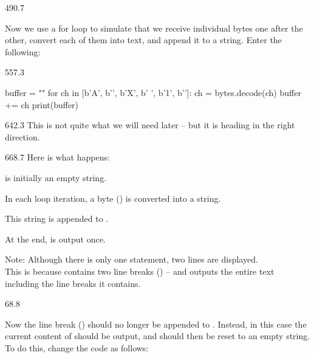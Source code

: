 \documentclass{aslab}
\newcommand*\codex[1]{\fontsize{10bp}{#1bp}\ttfamily\lineskiplimit=-\maxdimen}
\begin{document}
\begin{region}[pitch=13.2]{490.7}
\begin{tasks}[start=6]
\item Now we use a for loop to simulate that we receive individual bytes one
  after the other, convert each of them into text, and append it to a
  string.
  \blank
  Enter the following:
\end{tasks}
\end{region}

\begin{region}[x=74.7,right=0,pitch=14.3]{557.3}
\begin{codeblock}[basicstyle=\codex{14.3}]
buffer = ""
for ch in [b'A', b'\n', b'X', b' ', b'1', b'\n']:
    ch = bytes.decode(ch)
    buffer += ch
print(buffer)
\end{codeblock}
\end{region}

\begin{region}[x=74.7,right=0]{642.3}
This is not quite what we will need later -- but it is heading in the right
direction.
\end{region}

\begin{region}[x=74.7,right=0,pitch=13.5]{668.7}
Here is what happens:
\begin{dotlist}
\item {} is initially an empty string.
\item In each loop iteration, a byte () is converted into a string.
\item This string is appended to .
\item At the end,  is output once.
\end{dotlist}
Note: Although there is only one  statement, two lines are
displayed.\\
This is because  contains two line breaks
(\code{\n}) -- and  outputs the entire text including
the line breaks it contains.
\end{region}

\nextpage
\begin{region}[pitch=13.35]{68.8}
\begin{tasks}[start=7]
\item Now the line break (\code{\n}) should no longer be appended to
  . Instead, in this case the current content of 
  should be output, and  should then be reset to an empty
  string. To do this, change the code as follows:
\end{tasks}
\end{region}
\end{document}
